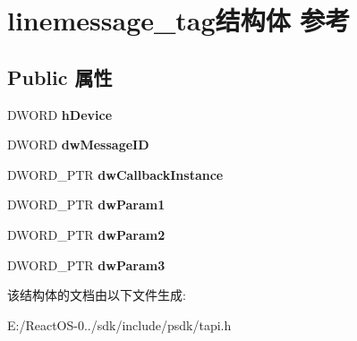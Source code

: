 \hypertarget{structlinemessage__tag}{}\section{linemessage\+\_\+tag结构体 参考}
\label{structlinemessage__tag}
\subsection*{Public 属性}
\begin{DoxyCompactItemize}
\item 
\mbox{\label{structlinemessage__tag_a40f05019d0015ad8c62314df6cf20187}} 
D\+W\+O\+RD {\bfseries h\+Device}
\item 
\mbox{\label{structlinemessage__tag_acbf1d5cf84e744934fce7249ec79782a}} 
D\+W\+O\+RD {\bfseries dw\+Message\+ID}
\item 
\mbox{\label{structlinemessage__tag_a864b964dcb72ae13b74200684f675b34}} 
D\+W\+O\+R\+D\+\_\+\+P\+TR {\bfseries dw\+Callback\+Instance}
\item 
\mbox{\label{structlinemessage__tag_ad4d51021fad9766fbccecb14304b7834}} 
D\+W\+O\+R\+D\+\_\+\+P\+TR {\bfseries dw\+Param1}
\item 
\mbox{\label{structlinemessage__tag_a8f55c450f96a81e8b8d55e61914b9558}} 
D\+W\+O\+R\+D\+\_\+\+P\+TR {\bfseries dw\+Param2}
\item 
\mbox{\label{structlinemessage__tag_a1f3e5ca828ddf041a1794ba71777eabd}} 
D\+W\+O\+R\+D\+\_\+\+P\+TR {\bfseries dw\+Param3}
\end{DoxyCompactItemize}


该结构体的文档由以下文件生成\+:\begin{DoxyCompactItemize}
\item 
E\+:/\+React\+O\+S-\/0../sdk/include/psdk/tapi.\+h\end{DoxyCompactItemize}
